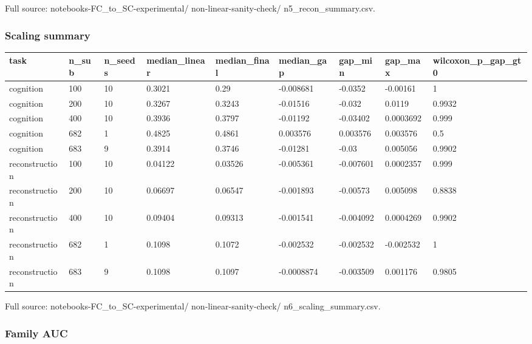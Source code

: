Full source: notebooks-FC\_to\_SC-experimental/ non-linear-sanity-check/ n5\_recon\_summary.csv.

\subsubsection{Scaling summary}\label{scaling-summary}

{\def\LTcaptype{none} %
\begin{longtable}[]{@{}lllllllll@{}}
\toprule\noalign{}
task & n\_sub & n\_seeds & median\_linear & median\_final & median\_gap & gap\_min & gap\_max & wilcoxon\_p\_gap\_gt0 \\
\midrule\noalign{}
\endhead
\bottomrule\noalign{}
\endlastfoot
cognition & 100 & 10 & 0.3021 & 0.29 & -0.008681 & -0.0352 & -0.00161 & 1 \\
cognition & 200 & 10 & 0.3267 & 0.3243 & -0.01516 & -0.032 & 0.0119 & 0.9932 \\
cognition & 400 & 10 & 0.3936 & 0.3797 & -0.01192 & -0.03402 & 0.0003692 & 0.999 \\
cognition & 682 & 1 & 0.4825 & 0.4861 & 0.003576 & 0.003576 & 0.003576 & 0.5 \\
cognition & 683 & 9 & 0.3914 & 0.3746 & -0.01281 & -0.03 & 0.005056 & 0.9902 \\
reconstruction & 100 & 10 & 0.04122 & 0.03526 & -0.005361 & -0.007601 & 0.0002357 & 0.999 \\
reconstruction & 200 & 10 & 0.06697 & 0.06547 & -0.001893 & -0.00573 & 0.005098 & 0.8838 \\
reconstruction & 400 & 10 & 0.09404 & 0.09313 & -0.001541 & -0.004092 & 0.0004269 & 0.9902 \\
reconstruction & 682 & 1 & 0.1098 & 0.1072 & -0.002532 & -0.002532 & -0.002532 & 1 \\
reconstruction & 683 & 9 & 0.1098 & 0.1097 & -0.0008874 & -0.003509 & 0.001176 & 0.9805 \\
\end{longtable}
}

Full source: notebooks-FC\_to\_SC-experimental/ non-linear-sanity-check/ n6\_scaling\_summary.csv.

\subsubsection{Family AUC}\label{family-auc}

